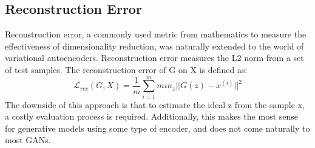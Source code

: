 \begin{comment}
Reconstruction error is primarily used in variational autoencoders. It's the error from feature reduction then reconstruction. 

One problem with it is with a generative network, it's hard to estimate exactly how much the encoding is off by, due to the difficulty of guessing what the GAN output "should" have been. Xiang and Li estimated the error using gradient descent on latent code to find a vector that minimizes the L2 norm between the sample generated from the code and the target sample. This makes the evaluation process time consuming. 

\end{comment}

\subsection{Reconstruction Error}
\label{sub:reconstruction_error}

Reconstruction error, a commonly used metric from mathematics to measure the effectiveness of dimensionality reduction, was naturally extended to the world of variational autoencoders. \cite{kingma2013auto}
Reconstruction error measures the L2 norm from a set of test samples. 
The reconstruction error of G on X is defined as: 
\begin{equation}
    \mathcal{L}_{rec} (G,X) = \frac{1}{m}\sum_{i=1}^{m}min_z||G(z)-x^{(i)}||^2
\end{equation}
The downside of this approach is that to estimate the ideal z from the sample x, a costly evaluation process is required. 
\cite{xiang2017effects}
Additionally, this makes the most sense for generative models using some type of encoder, and does not come naturally to most GANs.